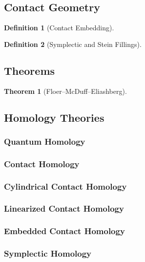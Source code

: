 \documentclass[a4paper]{article}
\theoremstyle{definition}
\newtheorem{thm}{Theorem}
\theoremstyle{definition}
\newtheorem{definition}{Definition}
\theoremstyle{remark}
\theoremstyle{remark}
\theoremstyle{remark}
\begin{document}
\subsection{Contact Geometry}

\begin{definition}[Contact Embedding]
  
\end{definition}

\begin{definition}[Symplectic and Stein Fillings]
  
\end{definition}

\subsection{Theorems}

\begin{thm}[Floer--McDuff--Eliashberg]
  
\end{thm}

\subsection{Homology Theories}

\subsubsection{Quantum Homology}

\subsubsection{Contact Homology}

\subsubsection{Cylindrical Contact Homology}

\subsubsection{Linearized Contact Homology}

\subsubsection{Embedded Contact Homology}

\subsubsection{Symplectic Homology}
\end{document}
